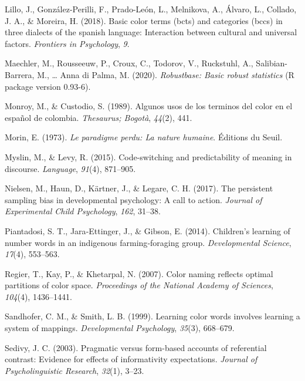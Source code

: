 \documentclass[
  english,
  ,man,floatsintext]{apa6}
\begin{document}
\leavevmode\hypertarget{ref-lillo2018}{}%
Lillo, J., González-Perilli, F., Prado-León, L., Melnikova, A., Álvaro, L., Collado, J. A., \& Moreira, H. (2018). Basic color terms (bcts) and categories (bccs) in three dialects of the spanish language: Interaction between cultural and universal factors. \emph{Frontiers in Psychology}, \emph{9}.

\leavevmode\hypertarget{ref-R-robustbase}{}%
Maechler, M., Rousseeuw, P., Croux, C., Todorov, V., Ruckstuhl, A., Salibian-Barrera, M., \ldots{} Anna di Palma, M. (2020). \emph{Robustbase: Basic robust statistics} (R package version 0.93-6).

\leavevmode\hypertarget{ref-monroy1989}{}%
Monroy, M., \& Custodio, S. (1989). Algunos usos de los terminos del color en el español de colombia. \emph{Thesaurus; Bogotà}, \emph{44}(2), 441.

\leavevmode\hypertarget{ref-morin1973}{}%
Morin, E. (1973). \emph{Le paradigme perdu: La nature humaine}. Éditions du Seuil.

\leavevmode\hypertarget{ref-myslin2015}{}%
Myslin, M., \& Levy, R. (2015). Code-switching and predictability of meaning in discourse. \emph{Language}, \emph{91}(4), 871--905.

\leavevmode\hypertarget{ref-nielson2017}{}%
Nielsen, M., Haun, D., Kärtner, J., \& Legare, C. H. (2017). The persistent sampling bias in developmental psychology: A call to action. \emph{Journal of Experimental Child Psychology}, \emph{162}, 31--38.

\leavevmode\hypertarget{ref-piantadosi2014}{}%
Piantadosi, S. T., Jara‐Ettinger, J., \& Gibson, E. (2014). Children's learning of number words in an indigenous farming‐foraging group. \emph{Developmental Science}, \emph{17}(4), 553--563.

\leavevmode\hypertarget{ref-regier2007}{}%
Regier, T., Kay, P., \& Khetarpal, N. (2007). Color naming reflects optimal partitions of color space. \emph{Proceedings of the National Academy of Sciences}, \emph{104}(4), 1436--1441.

\leavevmode\hypertarget{ref-sandhofer1999}{}%
Sandhofer, C. M., \& Smith, L. B. (1999). Learning color words involves learning a system of mappings. \emph{Developmental Psychology}, \emph{35}(3), 668--679.

\leavevmode\hypertarget{ref-sedivy2003}{}%
Sedivy, J. C. (2003). Pragmatic versus form-based accounts of referential contrast: Evidence for effects of informativity expectations. \emph{Journal of Psycholinguistic Research}, \emph{32}(1), 3--23.
\end{document}
